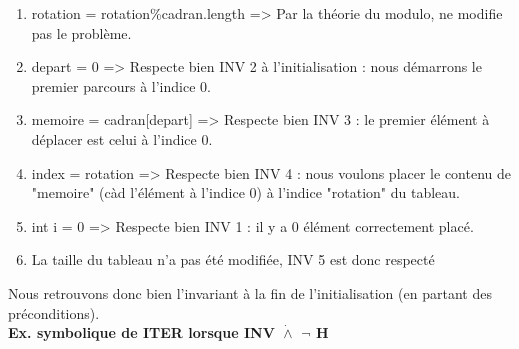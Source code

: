 \documentclass[a4paper, 12pt]{article}
\begin{document}
\begin{enumerate}

\item rotation = rotation\%cadran.length => Par la théorie du modulo, ne modifie pas le problème.

\item depart = 0 => Respecte bien INV 2 à l'initialisation : nous démarrons le premier parcours à l'indice 0.

\item memoire = cadran[depart] => Respecte bien INV 3 : le premier élément à déplacer est celui à l'indice 0.

\item  index = rotation => Respecte bien INV 4 : nous voulons placer le contenu de "memoire" (càd l'élément à l'indice 0) à l'indice "rotation" du tableau.
        
\item int i = 0 => Respecte bien INV 1 : il y a 0 élément correctement placé.

\item La taille du tableau n'a pas été modifiée, INV 5 est donc respecté
\end{enumerate}

Nous retrouvons donc bien l'invariant à la fin de l'initialisation (en partant des préconditions). \\


\textbf{Ex. symbolique de ITER lorsque {INV $\dot{\wedge}$ $\neg$ H}}\\
\end{document}
